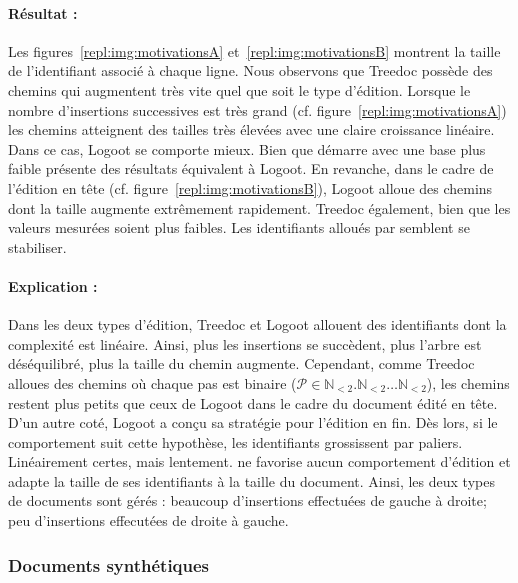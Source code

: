 \paragraph{Résultat :} Les figures~\ref{repl:img:motivationsA}
et~\ref{repl:img:motivationsB} montrent la taille de l'identifiant associé à
chaque ligne. Nous observons que Treedoc possède des chemins qui augmentent très
vite quel que soit le type d'édition. Lorsque le nombre d'insertions successives
est très grand (cf. figure~\ref{repl:img:motivationsA}) les chemins atteignent
des tailles très élevées avec une claire croissance linéaire. Dans ce cas,
Logoot se comporte mieux. Bien que \LSEQ démarre avec une base plus faible
présente des résultats équivalent à Logoot. En revanche, dans le cadre de
l'édition en tête (cf. figure~\ref{repl:img:motivationsB}), Logoot alloue des
chemins dont la taille augmente extrêmement rapidement. Treedoc également, bien
que les valeurs mesurées soient plus faibles. Les identifiants alloués par
\LSEQ semblent se stabiliser.


\paragraph{Explication :} Dans les deux types d'édition, Treedoc et Logoot
allouent des identifiants dont la complexité est linéaire. Ainsi, plus les
insertions se succèdent, plus l'arbre est déséquilibré, plus la taille du chemin
augmente. Cependant, comme Treedoc alloues des chemins où chaque pas est binaire
($\mathcal{P}\in \mathbb{N}_{<2}.\mathbb{N}_{<2}\ldots\mathbb{N}_{<2}$), les
chemins restent plus petits que ceux de Logoot dans le cadre du document édité
en tête. D'un autre coté, Logoot a conçu sa stratégie pour l'édition en fin. Dès
lors, si le comportement suit cette hypothèse, les identifiants grossissent par
paliers. Linéairement certes, mais lentement. \LSEQ ne favorise aucun
comportement d'édition et adapte la taille de ses identifiants à la taille du
document. Ainsi, les deux types de documents sont gérés : beaucoup d'insertions
effectuées de gauche à droite; peu d'insertions effecutées de droite à gauche.


\subsubsection{Documents synthétiques}

